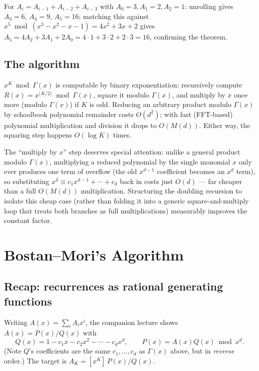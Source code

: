 \documentclass[11pt]{article}
\begin{document}
\begin{examplebox}
For $A_i = A_{i-1}+A_{i-2}+A_{i-3}$ with $A_0=3, A_1=2, A_2=1$: unrolling
gives $A_3=6$, $A_4=9$, $A_5=16$; matching this against
$x^5 \bmod (x^3-x^2-x-1) = 4x^2+3x+2$ gives
$A_5 = 4A_2+3A_1+2A_0 = 4{\cdot}1+3{\cdot}2+2{\cdot}3 = 16$, confirming the
theorem.
\end{examplebox}

\subsection{The algorithm}
$x^K \bmod \Gamma(x)$ is computable by binary exponentiation: recursively
compute $R(x) = x^{\lfloor K/2 \rfloor} \bmod \Gamma(x)$, square it modulo
$\Gamma(x)$, and multiply by $x$ once more (modulo $\Gamma(x)$) if $K$ is
odd. Reducing an arbitrary product modulo $\Gamma(x)$ by schoolbook
polynomial remainder costs $O(d^2)$; with fast (FFT-based) polynomial
multiplication and division it drops to $O(M(d))$. Either way, the
squaring step happens $O(\log K)$ times.

\begin{notebox}
The ``multiply by $x$'' step deserves special attention: unlike a general
product modulo $\Gamma(x)$, multiplying a reduced polynomial by the single
monomial $x$ only ever produces one term of overflow (the old
$x^{d-1}$ coefficient becomes an $x^d$ term), so substituting
$x^d \equiv c_1x^{d-1}+\cdots+c_d$ back in costs just $O(d)$ --- far
cheaper than a full $O(M(d))$ multiplication. Structuring the doubling
recursion to isolate this cheap case (rather than folding it into a
generic square-and-multiply loop that treats both branches as full
multiplications) measurably improves the constant factor.
\end{notebox}

\section{Bostan--Mori's Algorithm}

\subsection{Recap: recurrences as rational generating functions}
Writing $A(x) = \sum_i A_i x^i$, the companion lecture shows
$A(x) = P(x)/Q(x)$ with
\[
  Q(x) = 1 - c_1 x - c_2 x^2 - \cdots - c_d x^d, \qquad
  P(x) = A(x)Q(x) \bmod x^d.
\]
(Note $Q$'s coefficients are the same $c_1, \ldots, c_d$ as $\Gamma(x)$
above, but in \emph{reverse} order.) The target is
$A_K = [x^K]\,P(x)/Q(x)$.
\end{document}
